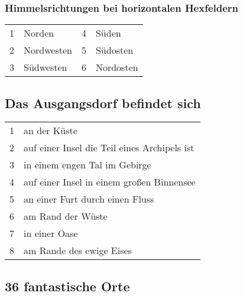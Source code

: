 \subsubsection{Himmelsrichtungen bei horizontalen Hexfeldern}
\begin{tabularx}{\columnwidth}{cZcZ}
1 & Norden & 4 & Süden\\
2 & Nordwesten & 5 & Südosten\\
3 & Südwesten & 6 & Nordosten\\
\end{tabularx}

\subsection{Das Ausgangsdorf befindet
sich}

\begin{tabularx}{\columnwidth}{cZ}
1 &  an der Küste \\
2 &  auf einer Insel die Teil eines Archipels ist \\
3 &  in einem engen Tal im Gebirge \\
4 &  auf einer Insel in einem großen Binnensee \\
5 &  an einer Furt durch einen Fluss \\
6 &  am Rand der Wüste \\
7 &  in einer Oase \\
8 &  am Rande des ewige Eises\\
\end{tabularx}

\subsection{36 fantastische Orte}

